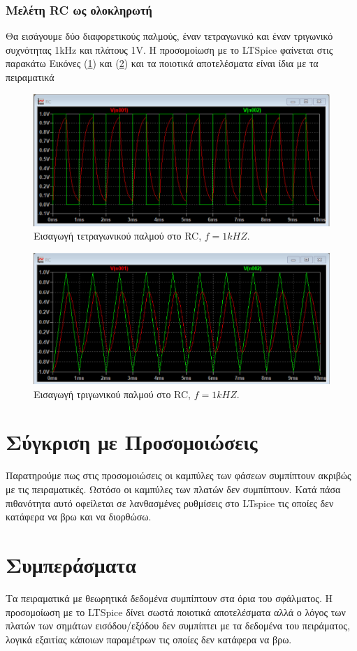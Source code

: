 \documentclass[a4paper]{article}
\begin{document}
		\newpage
		
		
		\subsubsection*{Μελέτη RC ως ολοκληρωτή}
		Θα εισάγουμε δύο διαφορετικούς παλμούς, έναν τετραγωνικό και έναν τριγωνικό συχνότητας 1kHz και πλάτους 1V. Η προσομοίωση με το LTSpice φαίνεται στις παρακάτω Εικόνες (\ref{fig15}) και (\ref{fig16}) και τα ποιοτικά αποτελέσματα είναι ίδια με τα πειραματικά 
	\newpage
			\begin{figure}[h!]
				\centering 
				\includegraphics[scale=0.4]{./figures/rc_rec.png}
				\caption{Εισαγωγή τετραγωνικού παλμού στο RC, $f=1kHZ$.}
				\label{fig15}
			\end{figure}
		
		\begin{figure}[h!]
			\centering 
			\includegraphics[scale=0.4]{./figures/rc_triag.png}
			\caption{Εισαγωγή τριγωνικού παλμού στο RC, $f=1kHZ$.}
			\label{fig16}
		\end{figure}
	
	
\section*{Σύγκριση με Προσομοιώσεις}
	Παρατηρούμε πως στις προσομοιώσεις οι καμπύλες των φάσεων συμπίπτουν ακριβώς με τις πειραματικές. Ωστόσο οι καμπύλες των πλατών δεν συμπίπτουν. Κατά πάσα πιθανότητα αυτό οφείλεται σε λανθασμένες ρυθμίσεις στο LTspice τις οποίες δεν κατάφερα να βρω και να διορθώσω.
	
\section*{Συμπεράσματα}
	Τα πειραματικά με θεωρητικά δεδομένα συμπίπτουν στα όρια του σφάλματος. Η προσομοίωση με το LTSpice δίνει σωστά ποιοτικά αποτελέσματα αλλά ο λόγος των πλατών των σημάτων εισόδου/εξόδου δεν συμπίπτει με τα δεδομένα του πειράματος, λογικά εξαιτίας κάποιων παραμέτρων τις οποίες δεν κατάφερα να βρω.
\end{document}
